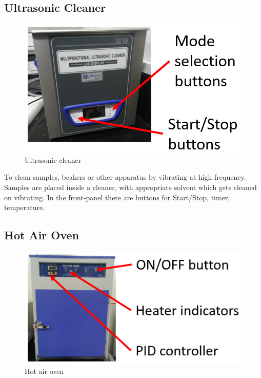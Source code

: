 \documentclass[12pt,a4paper,bold]{thesis}
\theoremstyle{thm}
\theoremstyle{definition}
\begin{document}
\subsection{Ultrasonic Cleaner}
\begin{figure}[H]
	\centering
   \includegraphics[scale=0.56]{Images/7.png} 
   \caption{Ultrasonic cleaner}
\end{figure}
To clean samples, beakers or other apparatus by vibrating at high frequency. Samples are placed inside a cleaner, with appropriate solvent which gets cleaned on vibrating. In the front-panel there are buttons for Start/Stop, timer, temperature.

\subsection{Hot Air Oven}
\begin{figure}[H]
	\centering
   \includegraphics[scale=0.56]{Images/8.png} 
   \caption{Hot air oven}
\end{figure}
\end{document}
